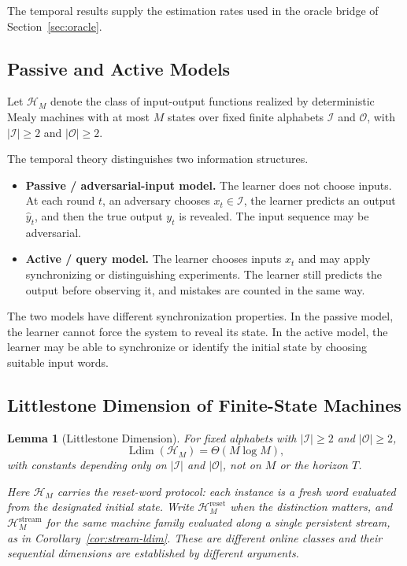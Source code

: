 \documentclass[12pt]{article}
\newtheorem{lemma}[theorem]{Lemma}
\theoremstyle{definition}
\DeclareMathOperator{\Ldim}{Ldim}
\begin{document}
The temporal results supply the estimation rates used in the oracle bridge of
Section~\ref{sec:oracle}.

\subsection{Passive and Active Models}
\label{subsec:temporal-models}

Let $\mathcal H_M$ denote the class of input-output functions realized by
deterministic Mealy machines with at most $M$ states over fixed finite
alphabets $\mathcal I$ and $\mathcal O$, with $|\mathcal I|\ge2$ and
$|\mathcal O|\ge2$.

The temporal theory distinguishes two information structures.

\begin{itemize}[leftmargin=1.8em]
\item \textbf{Passive / adversarial-input model.}
The learner does not choose inputs.  At each round $t$, an adversary chooses
$x_t\in\mathcal I$, the learner predicts an output $\widehat y_t$, and then
the true output $y_t$ is revealed.  The input sequence may be adversarial.

\item \textbf{Active / query model.}
The learner chooses inputs $x_t$ and may apply synchronizing or
distinguishing experiments.  The learner still predicts the output before
observing it, and mistakes are counted in the same way.
\end{itemize}

The two models have different synchronization properties.  In the passive
model, the learner cannot force the system to reveal its state.  In the active
model, the learner may be able to synchronize or identify the initial state by
choosing suitable input words.

\subsection{Littlestone Dimension of Finite-State Machines}
\label{subsec:littlestone}

\begin{lemma}[Littlestone Dimension]
\label{lem:littlestone}
For fixed alphabets with $|\mathcal I|\ge2$ and $|\mathcal O|\ge2$,
\[
\Ldim(\mathcal H_M)
=
\Theta(M\log M),
\]
with constants depending only on $|\mathcal I|$ and $|\mathcal O|$, not on $M$
or the horizon $T$.

Here $\mathcal H_M$ carries the \emph{reset-word} protocol: each instance is a
fresh word evaluated from the designated initial state.  Write
$\mathcal H_M^{\mathrm{reset}}$ when the distinction matters, and
$\mathcal H_M^{\mathrm{stream}}$ for the same machine family evaluated along a
single persistent stream, as in Corollary~\ref{cor:stream-ldim}.  These are
different online classes and their sequential dimensions are established by
different arguments.
\end{lemma}
\end{document}
